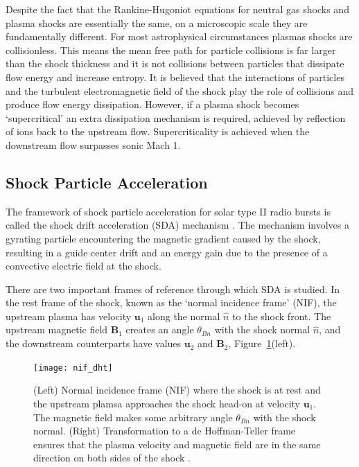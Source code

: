 Despite the fact that the Rankine-Hugoniot equations for neutral gas shocks and plasma shocks are essentially the same, on a microscopic scale they are fundamentally different. For most astrophysical circumstances plasmas shocks are collisionless. This means the mean free path for particle collisions is far larger than the shock thickness and it is not collisions between particles that dissipate flow energy and increase entropy. It is believed that the interactions of particles and the turbulent electromagnetic field of the shock play the role of collisions and produce flow energy dissipation. However, if a plasma shock becomes `supercritical' an extra dissipation mechanism is required, achieved by reflection of ions back to the upstream flow. Supercriticality is achieved when the downstream flow surpasses sonic Mach 1.

\subsection{Shock Particle Acceleration}\label{sec:30}

The framework of shock particle acceleration for solar type II radio bursts is called the shock drift acceleration (SDA) mechanism \citep{holman1983}. The mechanism involves a gyrating particle encountering the magnetic gradient caused by the shock, resulting in a guide center drift and an energy gain due to the presence of a convective electric field at the shock. 

There are two important frames of reference through which SDA is studied. In the rest frame of the shock, known as the \textquoteleft normal incidence frame' (NIF), the upstream plasma has velocity $\mathbf{u}_1$ along the normal $\hat{n}$ to the shock front. The upstream magnetic field $\mathbf{B}_1$ creates an angle $\theta_{Bn}$ with the shock normal $\hat{n}$, and the downstream counterparts have values $\mathbf{u}_2$ and $\mathbf{B}_2$, Figure~\ref{fig:nif_dht}(left). 

\begin{figure}[!t] 
\begin{center}
\texttt{[image: nif\_dht]}
\caption[Normal incidence and de Hoffman-Teller reference frames]{(Left) Normal incidence frame (NIF) where the shock is at rest and the upstream plamsa approaches the shock head-on at velocity $\mathbf{u}_1$. The magnetic field makes some arbitrary angle $\theta_{Bn}$ with the shock normal. (Right) Transformation to a de Hoffman-Teller frame ensures that the plasma velocity and magnetic field are in the same direction on both sides of the shock \citep{ball2001}.}
\label{fig:nif_dht}
\end{center}
\end{figure}


